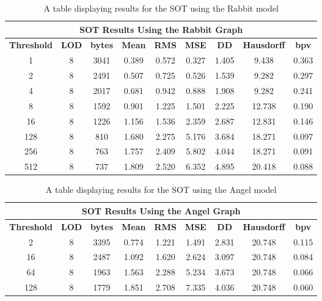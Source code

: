 \begin{table}[h]
\begin{tabular}[c]{|c|c|c|c|c|c|c|c|c|}
\hline\multicolumn{9}{|c|}{\textbf{SOT Results Using the Rabbit Graph}}\\
\hline
\textbf{Threshold} & \textbf{LOD} & \textbf{bytes} & \textbf{Mean} & \textbf{RMS} & \textbf{MSE} & \textbf{DD} & \textbf{Hausdorff} & \textbf{bpv}\\
\hline
1 & 8 & 3041 & 0.389 & 0.572 & 0.327 & 1.405 & 9.438 & 0.363\\
\hline
2 & 8 & 2491 & 0.507 & 0.725 & 0.526 & 1.539 & 9.282 & 0.297\\
\hline
4 & 8 & 2017 & 0.681 & 0.942 & 0.888 & 1.908 & 9.282 & 0.241\\
\hline
8 & 8 & 1592 & 0.901 & 1.225 & 1.501 & 2.225 & 12.738 & 0.190\\
\hline
16 & 8 & 1226 & 1.156 & 1.536 & 2.359 & 2.687 & 12.831 & 0.146\\
\hline
128 & 8 & 810 & 1.680 & 2.275 & 5.176 & 3.684 & 18.271 & 0.097\\
\hline
256 & 8 & 763 & 1.757 & 2.409 & 5.802 & 4.044 & 18.271 & 0.091\\
\hline
512 & 8 & 737 & 1.809 & 2.520 & 6.352 & 4.895 & 20.418 & 0.088\\
\hline
\end{tabular}
\caption{A table displaying results for the SOT using the Rabbit model}
\label{table:SOTTableRabbit}
\end{table}

\begin{table}[h]
\begin{tabular}[c]{|c|c|c|c|c|c|c|c|c|}
\hline\multicolumn{9}{|c|}{\textbf{SOT Results Using the Angel Graph}}\\
\hline
\textbf{Threshold} & \textbf{LOD} & \textbf{bytes} & \textbf{Mean} & \textbf{RMS} & \textbf{MSE} & \textbf{DD} & \textbf{Hausdorff} & \textbf{bpv}\\
\hline
2 & 8 & 3395 & 0.774 & 1.221 & 1.491 & 2.831 & 20.748 & 0.115\\
\hline
16 & 8 & 2487 & 1.092 & 1.620 & 2.624 & 3.097 & 20.748 & 0.084\\
\hline
64 & 8 & 1963 & 1.563 & 2.288 & 5.234 & 3.673 & 20.748 & 0.066\\
\hline
128 & 8 & 1779 & 1.851 & 2.708 & 7.335 & 4.036 & 20.748 & 0.060\\
\hline
\end{tabular}
\caption{A table displaying results for the SOT using the Angel model}
\label{table:SOTTableAngel}
\end{table}

